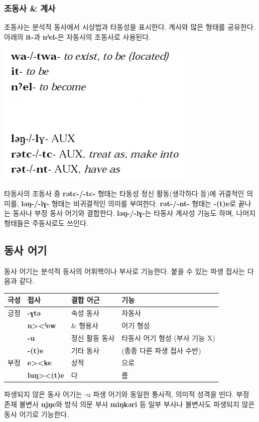 \subsubsection{조동사 \& 계사}
조동사는 분석적 동사에서 시상법과 타동성을 표시한다. 계사와 많은 형태를 공유한다. 아래의 \textbf{it-}과 \textbf{nˀel-}은 자동사의 조동사로 사용된다.
\begin{center}
\includegraphics{Chukchi/src/chau.png}
\end{center}
타동사의 조동사 중 \textbf{rətc-/-tc-} 형태는 타동성 정신 활동(생각하다 등)에 귀결적인 의미를, \textbf{ləŋ-/-lɣ-} 형태는 비귀결적인 의미를 부여한다. \textbf{rət-/-nt-} 형태는 \textbf{-(t)e}로 끝나는 동사나 부정 동사 어기와 결합한다. \textbf{ləŋ-/-lɣ-}는 타동사 계사성 기능도 하며, 나머지 형태들은 주동사로도 쓰인다.
\subsection{동사 어기}
동사 어기는 분석적 동사의 어휘핵이나 부사로 기능한다. 붙을 수 있는 파생 접사는 다음과 같다.
\begin{center}
\begin{tabular}{llll}
극성	&접사	&결합 어근	&기능\\
\hline
긍정	&\textbf{-ɣtə}	&속성 동사	&자동사\\
	&\textbf{n><ˀew}	&\& 형용사	&어기 형성\\
	&\textbf{-u}	&정신 활동 동사	&타동사 어기 형성 (부사 기능 X)\\
	&\textbf{-(t)e}	&기타 동사	&(종종 다른 파생 접사 수반)\\
\hline
부정	&\textbf{e><ke}	&상적	&으로\\
	&\textbf{luŋ><(t)e}	&다	&름\\
\hline
\end{tabular}
\end{center}
파생되지 않은 동사 어기는 -u 파생 어기와 동일한 통사적, 의미적 성격을 띤다. 부정 존재 불변사 \textbf{ujŋe}와 방식 의문 부사 \textbf{miŋkəri} 등 일부 부사나 불변사도 파생되지 않은 동사 어기로 기능한다.
